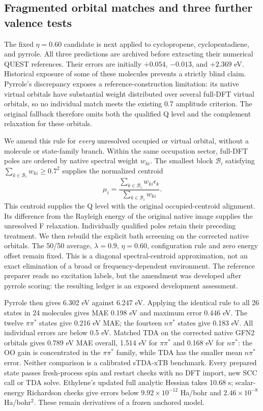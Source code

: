 \subsection{Fragmented orbital matches and three further valence tests}
The fixed $\eta=0.60$ candidate is next applied to cyclopropene,
cyclopentadiene, and pyrrole. All three predictions are archived before
extracting their numerical QUEST references. Their errors are initially
$+0.054$, $-0.013$, and $+2.369$ eV. Historical exposure of some of these
molecules prevents a strictly blind claim. Pyrrole's discrepancy exposes
a reference-construction limitation: its native virtual orbitals have
substantial weight distributed over several full-DFT virtual orbitals,
so no individual match meets the existing 0.7 amplitude criterion.
The original fallback therefore omits both the qualified Q level and the
complement relaxation for these orbitals.

We amend this rule for \emph{every} unresolved occupied or virtual orbital,
without a molecule or state-family branch. Within the same occupation
sector, full-DFT poles are ordered by native spectral weight $w_{ki}$.
The smallest block $\mathcal B_i$ satisfying
$\sum_{k\in\mathcal B_i}w_{ki}\geq0.7^2$ supplies the normalized centroid
\begin{equation}
 \mu_i=\frac{\sum_{k\in\mathcal B_i}w_{ki}\epsilon_k}
 {\sum_{k\in\mathcal B_i}w_{ki}} .
\end{equation}
This centroid supplies the Q level with the original occupied-centroid
alignment. Its difference from the Rayleigh energy of the original
native image supplies the unresolved F relaxation. Individually qualified
poles retain their preceding treatment. We then rebuild the explicit
bath screening on the corrected native orbitals. The 50/50 average,
$\lambda=0.9$, $\eta=0.60$, configuration rule and zero energy offset remain
fixed. This is a diagonal spectral-centroid approximation, not an exact
elimination of a broad or frequency-dependent environment. The reference
preparer reads no excitation labels, but the amendment was developed after
pyrrole scoring: the resulting ledger is an exposed development assessment.

Pyrrole then gives 6.302 eV against 6.247 eV. Applying the identical rule
to all 26 states in 24 molecules gives MAE 0.198 eV and maximum error
0.446 eV. The twelve $\pi\pi^*$ states give 0.216 eV MAE; the fourteen
$n\pi^*$ states give 0.183 eV. All individual errors are below 0.5 eV.
Matched TDA on the corrected native GFN2 orbitals gives 0.789 eV MAE
overall, 1.514 eV for $\pi\pi^*$ and 0.168 eV for $n\pi^*$: the OO gain
is concentrated in the $\pi\pi^*$ family, while TDA has the smaller mean
$n\pi^*$ error. Neither comparison is a calibrated sTDA-xTB benchmark.
Every prepared state passes fresh-process spin and restart checks with no
DFT import, new SCC call or TDA solve. Ethylene's updated full analytic
Hessian takes 10.68 s; scalar-energy Richardson checks give errors below
$9.92\times10^{-12}$ Ha/bohr and $2.46\times10^{-8}$ Ha/bohr$^2$.
These remain derivatives of a frozen anchored model.


